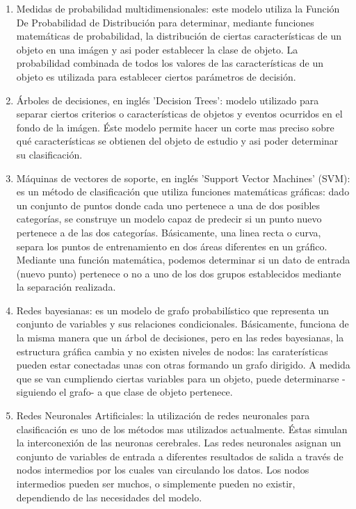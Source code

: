 \documentclass[a4paper,12pt,oneside,spanish]{book}
\begin{document}
\begin{enumerate}
	\baselineskip 0pt
	\item Medidas de probabilidad multidimensionales: este modelo utiliza la Función De Probabilidad de Distribución para determinar, mediante funciones matemáticas de probabilidad, la distribución de ciertas características de un objeto en una imágen y asi poder establecer la clase de objeto. La probabilidad combinada de todos los valores de las características de un objeto es utilizada para establecer ciertos parámetros de decisión.\\
	\item Árboles de decisiones, en inglés 'Decision Trees': modelo utilizado para separar ciertos criterios o características de objetos y eventos ocurridos en el fondo de la imágen. Éste modelo permite hacer un corte mas preciso sobre qué características se obtienen del objeto de estudio y asi poder determinar su clasificación.\\
	\item Máquinas de vectores de soporte, en inglés 'Support Vector Machines' (SVM): es un método de clasificación que utiliza funciones matemáticas gráficas: dado un conjunto de puntos donde cada uno pertenece a una de dos posibles categorías, se construye un modelo capaz de predecir si un punto nuevo pertenece a de las dos categorías. Básicamente, una linea recta o curva, separa los puntos de entrenamiento en dos áreas diferentes en un gráfico. Mediante una función matemática, podemos determinar si un dato de entrada (nuevo punto) pertenece o no a uno de los dos grupos establecidos mediante la separación realizada.\\
	\item Redes bayesianas: es un modelo de grafo probabilístico que representa un conjunto de variables y sus relaciones condicionales. Básicamente, funciona de la misma manera que un árbol de decisiones, pero en las redes bayesianas, la estructura gráfica cambia y no existen niveles de nodos: las caraterísticas pueden estar conectadas unas con otras formando un grafo dirigido. A medida que se van cumpliendo ciertas variables para un objeto, puede determinarse -siguiendo el grafo- a que clase de objeto pertenece.\\
	\item Redes Neuronales Artificiales: la utilización de redes neuronales para clasificación es uno de los métodos mas utilizados actualmente. Éstas simulan la interconexión de las neuronas cerebrales. Las redes neuronales asignan un conjunto de variables de entrada a diferentes resultados de salida a través de nodos intermedios por los cuales van circulando los datos. Los nodos intermedios pueden ser muchos, o simplemente pueden no existir, dependiendo de las necesidades del modelo.\\
\end{enumerate}	\baselineskip 14pt	
	
\end{document}

